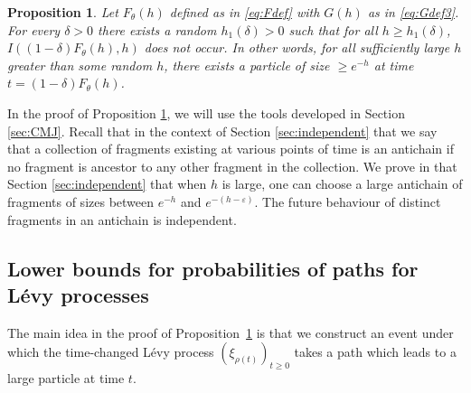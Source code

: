 \documentclass[a4,12pt]{amsart}
\numberwithin{equation}{section}
\newtheorem{proposition}[thm]{Proposition}
\begin{document}

	\begin{proposition} \label{prop:infinitelower}
		Let $ F_\theta(h)$ defined as in \eqref{eq:Fdef} with $G(h)$ as in \eqref{eq:Gdef3}. 
        	For every $\delta > 0$ there exists a random $h_1(\delta) > 0$ 
		such that for all $h \geq h_1(\delta)$, $I((1-\delta)F_\theta(h),h)$ does not occur. 
		In other words, for all sufficiently large $h$ greater than some random $h$, 
		there exists a particle of size $\geq e^{-h}$ at time $t = (1-\delta)F_\theta(h)$.
	\end{proposition}

	In the proof of Proposition \ref{prop:infinitelower}, we will use the tools developed in Section \ref{sec:CMJ}.
	Recall that in the context of Section \ref{sec:independent} that 
	we say that a collection of fragments existing at various 
	points of time is an antichain if no fragment is ancestor 
	to any other fragment in the collection. We prove in that 
	Section \ref{sec:independent} that when $h$ is large, one can choose a 
	large antichain of fragments of sizes between $e^{ - h}$ and 
	$e^{ -(h-\varepsilon)}$. The future behaviour of distinct fragments in an antichain is independent.


\subsection{Lower bounds for probabilities of paths for L\'evy processes}

	The main idea in the proof of Proposition~\ref{prop:infinitelower}
	is that we construct an event under which the time-changed 
	L\'evy process $(\xi_{\rho(t)})_{t \geq 0}$ takes a path which leads to a large particle at time $t$. 
\end{document}
